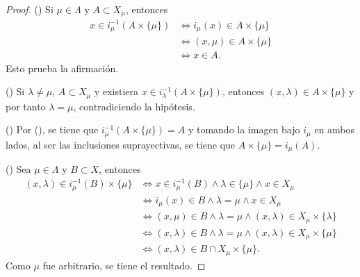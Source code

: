 \begin{proof}
({}) Si $\mu \in \Lambda$ y $A \subset X_{\mu}$, entonces
\begin{align*}
    x \in i^{-1}_{\mu}(A \times \{ \mu \}) & \iff i_{\mu}(x) \in A \times \{ \mu \} \\
                                           & \iff (x, \mu) \in A \times \{ \mu \} \\
                                           & \iff x \in A.
\end{align*}
Esto prueba la afirmación.
\bigskip

({}) Si $\lambda \ne \mu$, $A \subset X_{\mu}$ y existiera $x \in i^{-1}_{\lambda}(A \times \{ \mu \})$, entonces $(x,\lambda) \in A \times \{ \mu \}$ y por tanto $\lambda = \mu$, contradiciendo la hipótesis.
\bigskip

({}) Por ({}), se tiene que $i^{-1}_{\mu}(A \times \{ \mu \}) = A$ y tomando la imagen bajo $i_{\mu}$ en ambos lados, al ser las inclusiones suprayectivas, se tiene que $A \times \{ \mu \} = i_{\mu}(A)$.
\bigskip

({}) Sea $\mu \in \Lambda$ y $B \subset X$, entonces
\begin{align*}
    (x,\lambda) \in i^{-1}_{\mu}(B) \times \{ \mu \} & \iff x \in i^{-1}_{\mu}(B) \land \lambda \in \{ \mu \} \land x \in X_{\mu}  \\
                                                     & \iff i_{\mu}(x) \in B \land \lambda = \mu \land x \in X_{\mu} \\
                                                     & \iff (x,\mu) \in B \land \lambda = \mu \land (x, \lambda) \in X_{\mu} \times \{ \lambda \}  \\
                                                     & \iff (x,\lambda) \in B \land \lambda = \mu \land (x, \lambda) \in X_{\mu} \times \{ \mu \} \\
                                                     & \iff (x,\lambda) \in B \cap X_{\mu} \times \{ \mu \}.
\end{align*}
Como $\mu$ fue arbitrario, se tiene el resultado.
\end{proof}
